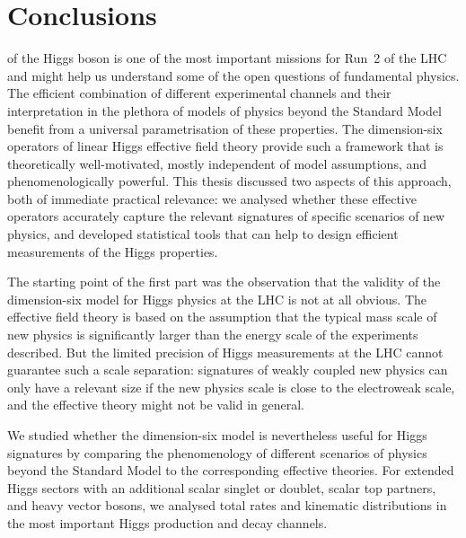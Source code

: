
 
\chapter{Conclusions}
\label{chapter:conclusions}

 of the Higgs boson is one of
the most important missions for Run~2 of the LHC and might help us
understand some of the open questions of fundamental physics. The
efficient combination of different experimental channels and their
interpretation in the plethora of models of physics beyond the
Standard Model benefit from a universal parametrisation of these
properties. The dimension-six operators of linear Higgs effective
field theory provide such a framework that is theoretically
well-motivated, mostly independent of model assumptions, and
phenomenologically powerful. This thesis discussed two aspects of this
approach, both of immediate practical relevance: we analysed whether
these effective operators accurately capture the relevant signatures
of specific scenarios of new physics, and developed statistical tools
that can help to design efficient measurements of the Higgs
properties.

\newparagraph
%
The starting point of the first part was the observation that the
validity of the dimension-six model for Higgs physics at the LHC is
not at all obvious. The effective field theory is based on the
assumption that the typical mass scale of new physics is significantly
larger than the energy scale of the experiments described. But the
limited precision of Higgs measurements at the LHC cannot guarantee
such a scale separation: signatures of weakly coupled new physics can
only have a relevant size if the new physics scale is close to the
electroweak scale, and the effective theory might not be valid in
general.

We studied whether the dimension-six model is nevertheless useful for
Higgs signatures
by comparing the phenomenology of different scenarios of physics
beyond the Standard Model to the corresponding effective theories. For
extended Higgs sectors with an additional scalar singlet or doublet,
scalar top partners, and heavy vector bosons, we analysed total rates
and kinematic distributions in the most important Higgs production and
decay channels.

